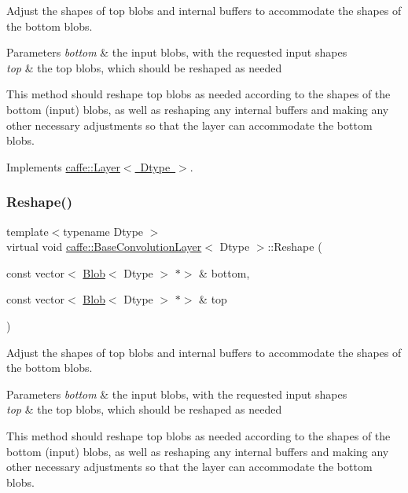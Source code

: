 Adjust the shapes of top blobs and internal buffers to accommodate the shapes of the bottom blobs. 


\begin{DoxyParams}{Parameters}
{\em bottom} & the input blobs, with the requested input shapes \\
\hline
{\em top} & the top blobs, which should be reshaped as needed\\
\hline
\end{DoxyParams}
This method should reshape top blobs as needed according to the shapes of the bottom (input) blobs, as well as reshaping any internal buffers and making any other necessary adjustments so that the layer can accommodate the bottom blobs. 

Implements \mbox{\hyperlink{classcaffe_1_1_layer_a7fe981e8af8d93d587acf2a952be563d}{caffe\+::\+Layer$<$ Dtype $>$}}.

\mbox{\label{classcaffe_1_1_base_convolution_layer_af384650d31552ea10b1a030788cb52d8}} 
\subsubsection{\texorpdfstring{Reshape()}{Reshape()}\hspace{0.1cm}{\footnotesize\ttfamily [2/2]}}
{\footnotesize\ttfamily template$<$typename Dtype $>$ \\
virtual void \mbox{\hyperlink{classcaffe_1_1_base_convolution_layer}{caffe\+::\+Base\+Convolution\+Layer}}$<$ Dtype $>$\+::Reshape (\begin{DoxyParamCaption}\item[{const vector$<$ \mbox{\hyperlink{classcaffe_1_1_blob}{Blob}}$<$ Dtype $>$ $\ast$$>$ \&}]{bottom,  }\item[{const vector$<$ \mbox{\hyperlink{classcaffe_1_1_blob}{Blob}}$<$ Dtype $>$ $\ast$$>$ \&}]{top }\end{DoxyParamCaption})\hspace{0.3cm}{\ttfamily [virtual]}}



Adjust the shapes of top blobs and internal buffers to accommodate the shapes of the bottom blobs. 


\begin{DoxyParams}{Parameters}
{\em bottom} & the input blobs, with the requested input shapes \\
\hline
{\em top} & the top blobs, which should be reshaped as needed\\
\hline
\end{DoxyParams}
This method should reshape top blobs as needed according to the shapes of the bottom (input) blobs, as well as reshaping any internal buffers and making any other necessary adjustments so that the layer can accommodate the bottom blobs. 

